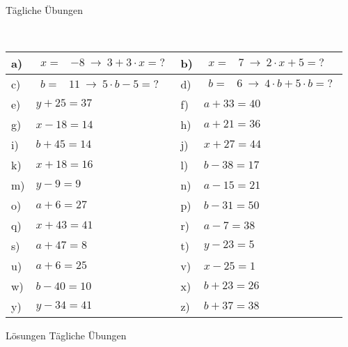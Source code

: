\documentclass[12pt]{article}
\begin{document}
\centerline{{\Large Tägliche Übungen}} 
\vspace{1cm}
\noindent \\


\begin{xltabular}{\textwidth}{|C{0.75cm}|X|C{0.75cm}|X|}
\hline
a)&$\begin{aligned}
 x=&-8~ \rightarrow ~ 3 + 3 \cdot x=?
\end{aligned}$
&
b)&$\begin{aligned}
 x=&7~ \rightarrow ~ 2 \cdot x + 5=?
\end{aligned}$
\\\hline
c)&$\begin{aligned}
 b=&11~ \rightarrow ~ 5 \cdot b - 5=?
\end{aligned}$
&
d)&$\begin{aligned}
 b=&6~ \rightarrow ~ 4 \cdot b + 5 \cdot b=?
\end{aligned}$
\\\hline
e)&$y+25 = 37$
&
f)&$a+33 = 40$
\\\hline
g)&$x-18 = 14$
&
h)&$a+21 = 36$
\\\hline
i)&$b+45 = 14$
&
j)&$x+27 = 44$
\\\hline
k)&$x+18 = 16$
&
l)&$b-38 = 17$
\\\hline
m)&$y-9 = 9$
&
n)&$a-15 = 21$
\\\hline
o)&$a+6 = 27$
&
p)&$b-31 = 50$
\\\hline
q)&$x+43 = 41$
&
r)&$a-7 = 38$
\\\hline
s)&$a+47 = 8$
&
t)&$y-23 = 5$
\\\hline
u)&$a+6 = 25$
&
v)&$x-25 = 1$
\\\hline
w)&$b-40 = 10$
&
x)&$b+23 = 26$
\\\hline
y)&$y-34 = 41$
&
z)&$b+37 = 38$
\\\hline
\end{xltabular}
\vspace{0.5cm}
\newpage
{}
\centerline{{\large Lösungen Tägliche Übungen}} 
\vspace{0.5cm}
\end{document}
